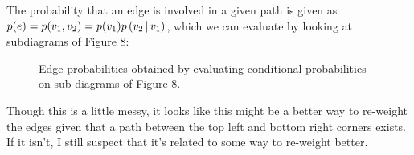 \documentclass[a4paper, english]{scrartcl}
\begin{document}
The probability that an edge is involved in a given path is given as $p(e) = p(v_1,v_2) = p(v_1)p\left(v_2 \, \middle \vert \, v_1 \right)$, which we can evaluate by looking at subdiagrams of Figure 8:
\begin{figure}
\centering
{}
\caption{Edge probabilities obtained by evaluating conditional probabilities on sub-diagrams of Figure 8.}
\end{figure}
\FloatBarrier
Though this is a little messy, it looks like this might be a better way to re-weight the edges given that a path between the top left and bottom right corners exists. 
If it isn't, I still suspect that it's related to some way to re-weight better.
\end{document}
